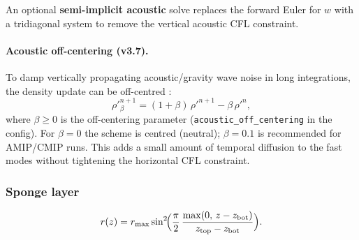 \documentclass[11pt,a4paper]{article}
\begin{document}
An optional \textbf{semi-implicit acoustic} solve replaces the forward Euler for $w$ with a tridiagonal system to remove the vertical acoustic CFL constraint.

\paragraph{Acoustic off-centering (v3.7).}
To damp vertically propagating acoustic/gravity wave noise in long integrations, the density update can be off-centred \citep{SkamarockKlemp2008}:
\begin{equation}
  \rho'^{n+1}_{\beta} = (1+\beta)\,\rho'^{n+1} - \beta\,\rho'^{n},
\end{equation}
where $\beta\ge 0$ is the off-centering parameter (\texttt{acoustic\_off\_centering} in the config).  For $\beta=0$ the scheme is centred (neutral); $\beta=0.1$ is recommended for AMIP/CMIP runs.  This adds a small amount of temporal diffusion to the fast modes without tightening the horizontal CFL constraint.

\subsubsection{Sponge layer}
\begin{equation}
  r(z) = r_{\max}\sin^2\!\Bigl(\frac{\pi}{2}\,\frac{\max(0,\,z-z_{\mathrm{bot}})}{z_{\mathrm{top}}-z_{\mathrm{bot}}}\Bigr).
\end{equation}
\end{document}
